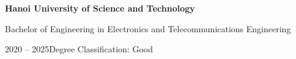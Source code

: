 \textbf{Hanoi University of Science and Technology}\par
Bachelor of Engineering in Electronics and Telecommunications Engineering\par
2020 -- 2025\enspace\textbar\enspace Degree Classification: Good\par
